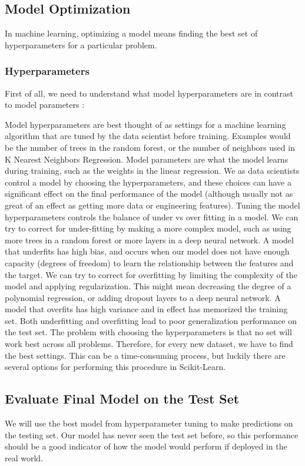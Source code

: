 \documentclass{article}
\begin{document}
\subsection*{Model Optimization}
In machine learning, optimizing a model means finding the best set of hyperparameters for a particular problem.

\subsubsection*{Hyperparameters}
First of all, we need to understand what model hyperparameters are in contrast to model parameters :

Model hyperparameters are best thought of as settings for a machine learning algorithm that are tuned by the data scientist before training. Examples would be the number of trees in the random forest, or the number of neighbors used in K Nearest Neighbors Regression.
Model parameters are what the model learns during training, such as the weights in the linear regression. We as data scientists control a model by choosing the hyperparameters, and these choices can have a significant effect on the final performance of the model (although usually not as great of an effect as getting more data or engineering features). Tuning the model hyperparameters controls the balance of under vs over fitting in a model. We can try to correct for under-fitting by making a more complex model, such as using more trees in a random forest or more layers in a deep neural network. A model that underfits has high bias, and occurs when our model does not have enough capacity (degrees of freedom) to learn the relationship between the features and the target. We can try to correct for overfitting by limiting the complexity of the model and applying regularization. This might mean decreasing the degree of a polynomial regression, or adding dropout layers to a deep neural network. A model that overfits has high variance and in effect has memorized the training set. Both underfitting and overfitting lead to poor generalization performance on the test set.
The problem with choosing the hyperparameters is that no set will work best across all problems. Therefore, for every new dataset, we have to find the best settings. This can be a time-consuming process, but luckily there are several options for performing this procedure in Scikit-Learn.


\subsection*{Evaluate Final Model on the Test Set}
We will use the best model from hyperparameter tuning to make predictions on the testing set. Our model has never seen the test set before, so this performance should be a good indicator of how the model would perform if deployed in the real world.
\end{document}
